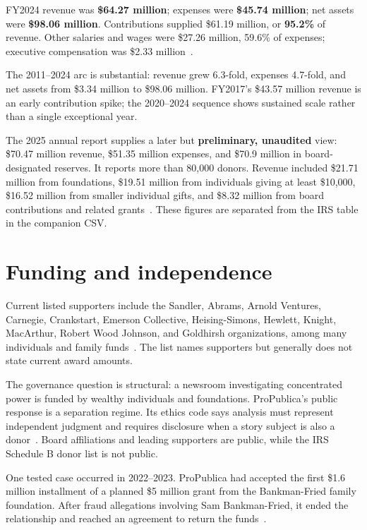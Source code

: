 \documentclass[10pt,letterpaper,twocolumn]{article}
\begin{document}
FY2024 revenue was \textbf{\$64.27 million}; expenses were \textbf{\$45.74 million}; net assets were \textbf{\$98.06 million}. Contributions supplied \$61.19 million, or \textbf{95.2\%} of revenue. Other salaries and wages were \$27.26 million, 59.6\% of expenses; executive compensation was \$2.33 million~\citep{pp990}.

The 2011--2024 arc is substantial: revenue grew 6.3-fold, expenses 4.7-fold, and net assets from \$3.34 million to \$98.06 million. FY2017's \$43.57 million revenue is an early contribution spike; the 2020--2024 sequence shows sustained scale rather than a single exceptional year.

The 2025 annual report supplies a later but \textbf{preliminary, unaudited} view: \$70.47 million revenue, \$51.35 million expenses, and \$70.9 million in board-designated reserves. It reports more than 80,000 donors. Revenue included \$21.71 million from foundations, \$19.51 million from individuals giving at least \$10,000, \$16.52 million from smaller individual gifts, and \$8.32 million from board contributions and related grants~\citep{pp2025}. These figures are separated from the IRS table in the companion CSV.

\section{Funding and independence}

Current listed supporters include the Sandler, Abrams, Arnold Ventures, Carnegie, Crankstart, Emerson Collective, Heising-Simons, Hewlett, Knight, MacArthur, Robert Wood Johnson, and Goldhirsh organizations, among many individuals and family funds~\citep{ppsupporters,pp2025}. The list names supporters but generally does not state current award amounts.

The governance question is structural: a newsroom investigating concentrated power is funded by wealthy individuals and foundations. ProPublica's public response is a separation regime. Its ethics code says analysis must represent independent judgment and requires disclosure when a story subject is also a donor~\citep{ppethics}. Board affiliations and leading supporters are public, while the IRS Schedule B donor list is not public.

One tested case occurred in 2022--2023. ProPublica had accepted the first \$1.6 million installment of a planned \$5 million grant from the Bankman-Fried family foundation. After fraud allegations involving Sam Bankman-Fried, it ended the relationship and reached an agreement to return the funds~\citep{ppsbf}.
\end{document}
